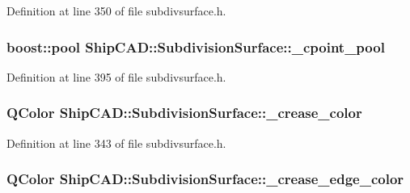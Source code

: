 Definition at line 350 of file subdivsurface.\-h.

\hypertarget{classShipCAD_1_1SubdivisionSurface_abd895a11906e0d5b5f8f4a5fc090b428}{
\subsubsection[{\-\_\-cpoint\-\_\-pool}]{\setlength{\rightskip}{0pt plus 5cm}boost\-::pool Ship\-C\-A\-D\-::\-Subdivision\-Surface\-::\-\_\-cpoint\-\_\-pool\hspace{0.3cm}{\ttfamily [protected]}}}\label{classShipCAD_1_1SubdivisionSurface_abd895a11906e0d5b5f8f4a5fc090b428}


Definition at line 395 of file subdivsurface.\-h.

\hypertarget{classShipCAD_1_1SubdivisionSurface_aaa3b772931e04f8650db2d005ae05d6a}{
\subsubsection[{\-\_\-crease\-\_\-color}]{\setlength{\rightskip}{0pt plus 5cm}Q\-Color Ship\-C\-A\-D\-::\-Subdivision\-Surface\-::\-\_\-crease\-\_\-color\hspace{0.3cm}{\ttfamily [protected]}}}\label{classShipCAD_1_1SubdivisionSurface_aaa3b772931e04f8650db2d005ae05d6a}


Definition at line 343 of file subdivsurface.\-h.

\hypertarget{classShipCAD_1_1SubdivisionSurface_a6106aee9d086aa377d9a3a6a6291b54c}{
\subsubsection[{\-\_\-crease\-\_\-edge\-\_\-color}]{\setlength{\rightskip}{0pt plus 5cm}Q\-Color Ship\-C\-A\-D\-::\-Subdivision\-Surface\-::\-\_\-crease\-\_\-edge\-\_\-color\hspace{0.3cm}{\ttfamily [protected]}}}\label{classShipCAD_1_1SubdivisionSurface_a6106aee9d086aa377d9a3a6a6291b54c}


